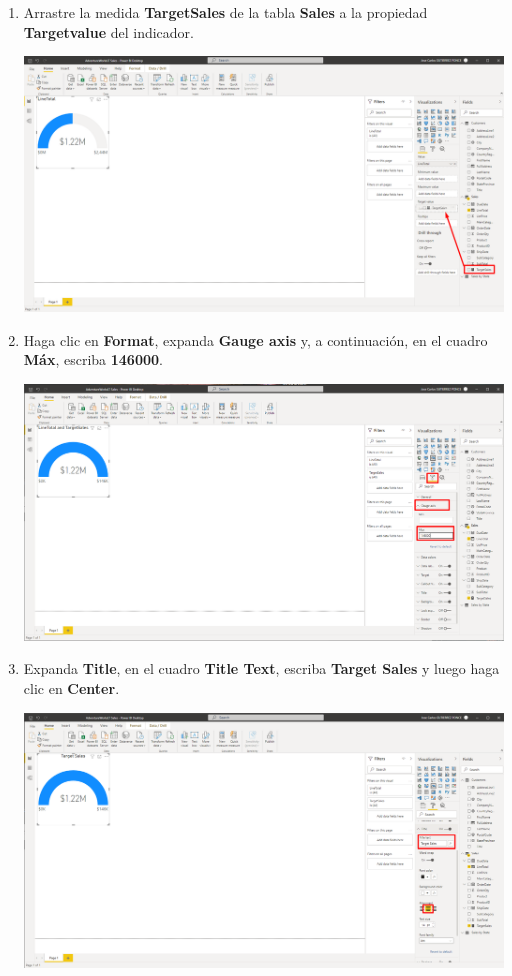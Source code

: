 \documentclass[12pt,letterpaper]{article}
\newcommand\tab[1][1cm]{\hspace*{#1}}
\begin{document}
\begin{enumerate}[\tab 1.]
\begin{center}
        \end{center}
        \item Arrastre la medida \textbf{TargetSales} de la tabla \textbf{Sales} a la propiedad \textbf{Targetvalue} del indicador.
        \begin{center}
            \includegraphics[width=13cm]{./img/img80.png}
        \end{center}
        \item Haga clic en \textbf{Format}, expanda \textbf{Gauge axis} y, a continuación, en el cuadro \textbf{Máx}, escriba \textbf{146000}.
        \begin{center}
            \includegraphics[width=13cm]{./img/img81.png}
        \end{center}
        \item Expanda \textbf{Title}, en el cuadro \textbf{Title Text}, escriba \textbf{Target Sales} y luego haga clic en \textbf{Center}.
        \begin{center}
            \includegraphics[width=13cm]{./img/img82.png}

\end{center}
\end{enumerate}
\end{document}
